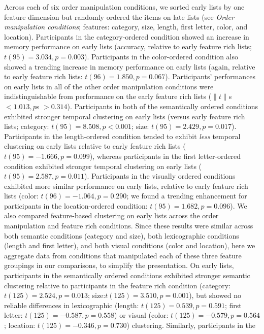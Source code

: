\documentclass[11pt]{article}
\begin{document}
Across each of six order manipulation conditions, we sorted early lists by one
feature dimension but randomly ordered the items on late lists (see
\textit{Order manipulation conditions}; features: category, size, length, first
letter, color, and location). Participants in the category-ordered condition
showed an increase in memory performance on early lists (accuracy, relative to
early feature rich lists; $t(95) = 3.034, p = 0.003$). Participants in the
color-ordered condition also showed a trending increase in memory performance
on early lists (again, relative to early feature rich lists: $t(96) = 1.850, p
= 0.067$). Participants' performances on early lists in all of the other order
manipulation conditions were indistinguishable from performance on the early
feature rich lists ($\|t\|$s $< 1.013, p$s $> 0.314$). Participants in both of
the semantically ordered conditions exhibited stronger temporal clustering on
early lists (versus early feature rich lists; category: $t(95) = 8.508, p <
0.001$; size: $t(95) = 2.429, p = 0.017$). Participants in the length-ordered
condition tended to exhibit \textit{less} temporal clustering on early lists
relative to early feature rich lists ($t(95) = -1.666, p = 0.099$), whereas
participants in the first letter-ordered condition exhibited stronger temporal
clustering on early lists ($t(95) = 2.587, p = 0.011$). Participants in the
visually ordered conditions exhibited more similar performance on early lists,
relative to early feature rich lists (color: $t(96) = -1.064, p = 0.290$; we
found a trending enhancement for participants in the location-ordered
condition: $t(95) = 1.682, p = 0.096$). We also compared feature-based
clustering on early lists across the order manipulation and feature rich
conditions. Since these results were similar across both semantic conditions
(category and size), both lexicographic conditions (length and first letter),
and both visual conditions (color and location), here we aggregate data from
conditions that manipulated each of these three feature groupings in our
comparisons, to simplify the presentation. On early lists, participants in the
semantically ordered conditions exhibited stronger semantic clustering relative
to participants in the feature rich condition (category: $t(125) = 2.524, p =
0.013$; size:$t(125) = 3.510, p = 0.001$), but showed no reliable differences
in lexicographic (length: $t(125) = 0.539, p = 0.591$; first letter: $t(125) =
-0.587, p = 0.558$) or visual (color: $t(125) = -0.579, p = 0.564$; location:
$t(125) = -0.346, p = 0.730$) clustering. Similarly, participants in the
\end{document}
